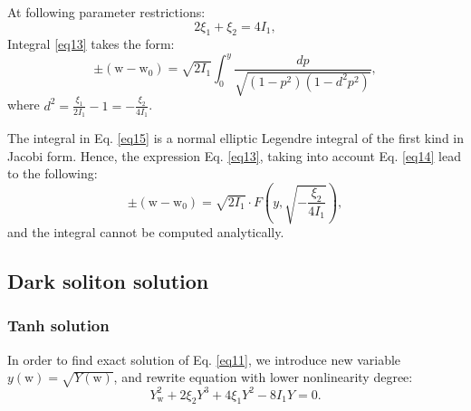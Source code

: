 \documentclass{article}
\begin{document}
            At following parameter restrictions:
            \begin{equation} \label{eq14}
                2 \xi_{1} + \xi_{2} = 4I_{1},
            \end{equation}
            Integral \ref{eq13} takes the form:
            \begin{equation} \label{eq15}
                \pm \left(\mathrm{w} - \mathrm{w}_{0}\right) = \sqrt{2I_{1}}\int_{0}^{y} \frac{dp}{ \sqrt{\left(1 - p^2\right)\left(1 - d^2 p^2\right)}},
            \end{equation}
            where \(d^2 = \frac{\xi_{1}}{2I_{1}} -1 =-\frac{\xi_{2}}{4I_{1}}\).

            The integral in Eq. \ref{eq15} is a normal elliptic Legendre integral of the first kind in Jacobi form. Hence, the expression Eq. \ref{eq13}, taking into account Eq. \ref{eq14} lead to the following:
            \begin{equation} \label{eq16}
                \pm \left(\mathrm{w} - \mathrm{w}_{0}\right) = \sqrt{2I_{1}} \cdot F \left(y, \sqrt{- \frac{\xi_{2}}{4I_{1}}} \right),
            \end{equation}
            and the integral cannot be computed analytically.

        \subsection{Dark soliton solution}

            \subsubsection{Tanh solution}
                In order to find exact solution of Eq. \ref{eq11}, we introduce new variable \(y\left(\mathrm{w}\right) = \sqrt{Y\left(\mathrm{w}\right)}\), and rewrite equation with lower nonlinearity degree:
                \begin{equation} \label{eq17}
                    Y^2_{\mathrm{w}} + 2\xi_{2}Y^3 + 4\xi_{1}Y^2 -8 I_{1} Y = 0.
                \end{equation}
\end{document}
